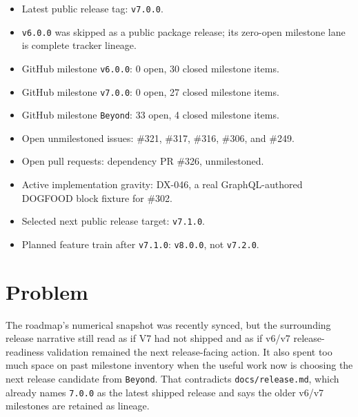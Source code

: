 \begin{itemize}
\tightlist
\item
  Latest public release tag: \texttt{v\allowbreak{}7\allowbreak{}.\allowbreak{}0\allowbreak{}.\allowbreak{}0}.
\item
  \texttt{v\allowbreak{}6\allowbreak{}.\allowbreak{}0\allowbreak{}.\allowbreak{}0} was skipped as a public package release; its zero-open milestone lane is complete tracker lineage.
\item
  GitHub milestone \texttt{v\allowbreak{}6\allowbreak{}.\allowbreak{}0\allowbreak{}.\allowbreak{}0}: 0 open, 30 closed milestone items.
\item
  GitHub milestone \texttt{v\allowbreak{}7\allowbreak{}.\allowbreak{}0\allowbreak{}.\allowbreak{}0}: 0 open, 27 closed milestone items.
\item
  GitHub milestone \texttt{B\allowbreak{}e\allowbreak{}y\allowbreak{}o\allowbreak{}n\allowbreak{}d}: 33 open, 4 closed milestone items.
\item
  Open unmilestoned issues: \#321, \#317, \#316, \#306, and \#249.
\item
  Open pull requests: dependency PR \#326, unmilestoned.
\item
  Active implementation gravity: DX-046, a real GraphQL-authored DOGFOOD block fixture for \#302.
\item
  Selected next public release target: \texttt{v\allowbreak{}7\allowbreak{}.\allowbreak{}1\allowbreak{}.\allowbreak{}0}.
\item
  Planned feature train after \texttt{v\allowbreak{}7\allowbreak{}.\allowbreak{}1\allowbreak{}.\allowbreak{}0}: \texttt{v\allowbreak{}8\allowbreak{}.\allowbreak{}0\allowbreak{}.\allowbreak{}0}, not \texttt{v\allowbreak{}7\allowbreak{}.\allowbreak{}2\allowbreak{}.\allowbreak{}0}.
\end{itemize}

\section{Problem}\label{record-213-problem}

The roadmap's numerical snapshot was recently synced, but the surrounding release narrative still read as if V7 had not shipped and as if v6/v7 release-readiness validation remained the next release-facing action. It also spent too much space on past milestone inventory when the useful work now is choosing the next release candidate from \texttt{B\allowbreak{}e\allowbreak{}y\allowbreak{}o\allowbreak{}n\allowbreak{}d}. That contradicts \texttt{d\allowbreak{}o\allowbreak{}c\allowbreak{}s\allowbreak{}/\allowbreak{}r\allowbreak{}e\allowbreak{}l\allowbreak{}e\allowbreak{}a\allowbreak{}s\allowbreak{}e\allowbreak{}.\allowbreak{}m\allowbreak{}d}, which already names \texttt{7\allowbreak{}.\allowbreak{}0\allowbreak{}.\allowbreak{}0} as the latest shipped release and says the older v6/v7 milestones are retained as lineage.

